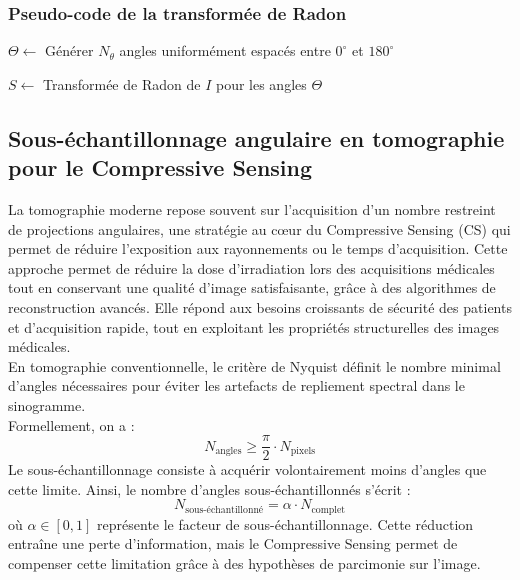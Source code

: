 \subsubsection*{Pseudo-code de la transformée de Radon}
\begin{algorithm}[H]
    \caption{Génération d'un sinogramme par transformée de Radon}

    $\Theta \leftarrow$ Générer $N_{\theta}$ angles uniformément espacés entre $0^\circ$ et $180^\circ$\;

    $S \leftarrow$ Transformée de Radon de $I$ pour les angles $\Theta$\;


    \;
\end{algorithm}
\subsection{Sous-échantillonnage angulaire en tomographie pour le Compressive Sensing}

La tomographie moderne repose souvent sur l'acquisition d'un nombre restreint de projections angulaires, une stratégie au cœur du Compressive Sensing (CS) qui permet de réduire l'exposition aux rayonnements ou le temps d'acquisition. Cette approche permet de réduire la dose d'irradiation lors des acquisitions médicales tout en conservant une qualité d'image satisfaisante, grâce à des algorithmes de reconstruction avancés. Elle répond aux besoins croissants de sécurité des patients et d'acquisition rapide, tout en exploitant les propriétés structurelles des images médicales.\\
En tomographie conventionnelle, le critère de Nyquist définit le nombre minimal d'angles nécessaires pour éviter les artefacts de repliement spectral dans le sinogramme.\\ Formellement, on a :
\begin{equation}
N_{\text{angles}} \geq \frac{\pi}{2} \cdot N_{\text{pixels}}
\end{equation}
Le sous-échantillonnage consiste à acquérir volontairement moins d'angles que cette limite. Ainsi, le nombre d'angles sous-échantillonnés s'écrit :
\begin{equation}
N_{\text{sous-échantillonné}} = \alpha \cdot N_{\text{complet}}
\end{equation}
où \(\alpha \in [0,1]\) représente le facteur de sous-échantillonnage. Cette réduction entraîne une perte d'information, mais le Compressive Sensing permet de compenser cette limitation grâce à des hypothèses de parcimonie sur l'image.\\

